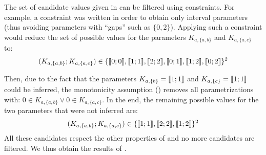 \begin{example}
The set of candidate values given in  can be filtered using constraints.
For example, a constraint was written in order to obtain only interval parameters
(thus avoiding parameters with “gaps” such as $\{ 0, 2 \}$).
Applying such a constraint would reduce the set of possible values for the parameters $K_{a,\{a,b\}}$ and $K_{a,\{a,c\}}$ to:
\begin{align*}
  (K_{a,\{a,b\}} ; K_{a,\{a,c\}}) \in \{ \llbracket 0 ; 0 \rrbracket , \llbracket 1 ; 1 \rrbracket , \llbracket 2 ; 2 \rrbracket , \llbracket 0 ; 1 \rrbracket , \llbracket 1 ; 2 \rrbracket , \llbracket 0 ; 2 \rrbracket \}^2
\end{align*}

Then, due to the fact that the parameters $K_{a,\{b\}} = \llbracket 1 ; 1 \rrbracket$ and $K_{a,\{c\}} = \llbracket 1 ; 1 \rrbracket$ could be inferred,
the monotonicity assumption () removes all parametrizations with: $0 \in K_{a,\{a,b\}} \vee 0 \in K_{a,\{a,c\}}$.
In the end, the remaining possible values for the two parameters that were not inferred are:
\begin{align*}
  (K_{a,\{a,b\}} ; K_{a,\{a,c\}}) \in \{ \llbracket 1 ; 1 \rrbracket , \llbracket 2 ; 2 \rrbracket , \llbracket 1 ; 2 \rrbracket \}^2
\end{align*}
All these candidates respect the other properties of  and no more candidates are filtered.
We thus obtain the results of .
\end{example}



